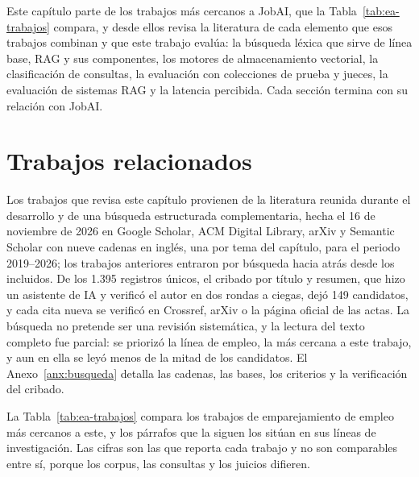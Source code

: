 Este capítulo parte de los trabajos más cercanos a JobAI, que la Tabla~\ref{tab:ea-trabajos} compara, y desde ellos revisa la literatura de cada elemento que esos trabajos combinan y que este trabajo evalúa: la búsqueda léxica que sirve de línea base, RAG y sus componentes, los motores de almacenamiento vectorial, la clasificación de consultas, la evaluación con colecciones de prueba y jueces, la evaluación de sistemas RAG y la latencia percibida. Cada sección termina con su relación con JobAI.

\section{Trabajos relacionados}
\label{sec:estado-arte-tabla}
\label{sec:estado-arte-empleo}
\label{sec:estado-arte-metodo}

Los trabajos que revisa este capítulo provienen de la literatura reunida durante el desarrollo y de una búsqueda estructurada complementaria, hecha el 16 de noviembre de 2026 en Google Scholar, ACM Digital Library, arXiv y Semantic Scholar con nueve cadenas en inglés, una por tema del capítulo, para el periodo 2019--2026; los trabajos anteriores entraron por búsqueda hacia atrás desde los incluidos. De los 1.395 registros únicos, el cribado por título y resumen, que hizo un asistente de IA y verificó el autor en dos rondas a ciegas, dejó 149 candidatos, y cada cita nueva se verificó en Crossref, arXiv o la página oficial de las actas. La búsqueda no pretende ser una revisión sistemática, y la lectura del texto completo fue parcial: se priorizó la línea de empleo, la más cercana a este trabajo, y aun en ella se leyó menos de la mitad de los candidatos. El Anexo~\ref{anx:busqueda} detalla las cadenas, las bases, los criterios y la verificación del cribado.

La Tabla~\ref{tab:ea-trabajos} compara los trabajos de emparejamiento de empleo más cercanos a este, y los párrafos que la siguen los sitúan en sus líneas de investigación. Las cifras son las que reporta cada trabajo y no son comparables entre sí, porque los corpus, las consultas y los juicios difieren.

